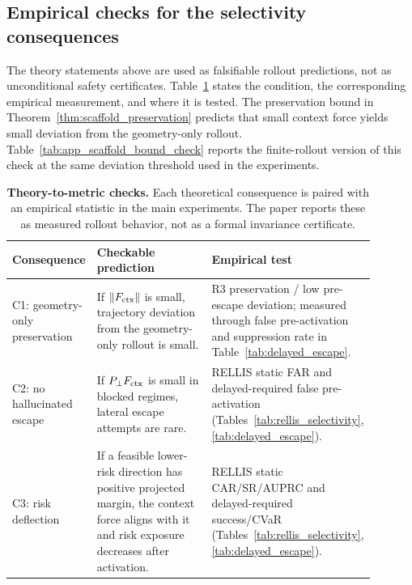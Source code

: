 \subsection{Empirical checks for the selectivity consequences}
\label{app:theory_empirical_checks}

The theory statements above are used as falsifiable rollout predictions, not as
unconditional safety certificates. Table~\ref{tab:app_theory_checks} states the
condition, the corresponding empirical measurement, and where it is tested.
The preservation bound in Theorem~\ref{thm:scaffold_preservation}
predicts that small context force yields small deviation from the geometry-only rollout.
Table~\ref{tab:app_scaffold_bound_check} reports the finite-rollout version of
this check at the same deviation threshold used in the experiments.

\begin{table}[h]
\centering
\caption{\textbf{Theory-to-metric checks.} Each theoretical consequence is
paired with an empirical statistic in the main experiments. The paper reports
these as measured rollout behavior, not as a formal invariance certificate.}
\label{tab:app_theory_checks}
\small
\begin{tabular}{p{0.23\linewidth}p{0.32\linewidth}p{0.34\linewidth}}
\toprule
Consequence & Checkable prediction & Empirical test \\
\midrule
C1: geometry-only preservation
& If $\|F_{\rm ctx}\|$ is small, trajectory deviation from the geometry-only rollout is small.
& R3 preservation / low pre-escape deviation; measured through false
pre-activation and suppression rate in Table~\ref{tab:delayed_escape}. \\
C2: no hallucinated escape
& If $P_\perp F_{\rm ctx}$ is small in blocked regimes, lateral escape attempts
are rare.
& RELLIS static FAR and delayed-required false pre-activation
(Tables~\ref{tab:rellis_selectivity}, \ref{tab:delayed_escape}). \\
C3: risk deflection
& If a feasible lower-risk direction has positive projected margin, the context
force aligns with it and risk exposure decreases after activation.
& RELLIS static CAR/SR/AUPRC and delayed-required success/CVaR
(Tables~\ref{tab:rellis_selectivity}, \ref{tab:delayed_escape}). \\
\bottomrule
\end{tabular}
\end{table}

